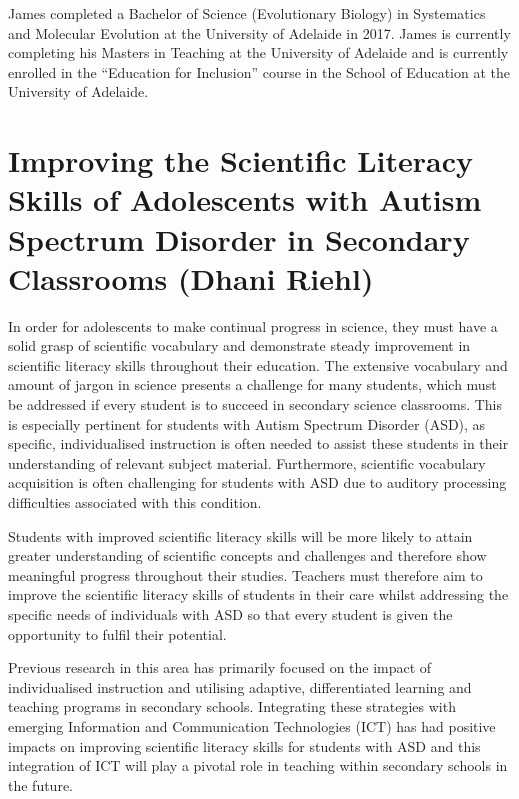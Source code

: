 \documentclass[twoside,12pt,a4paper,notitlepage]{memoir}
\begin{document}
James completed a Bachelor of Science (Evolutionary Biology) in Systematics and Molecular Evolution at the University of Adelaide in 2017. James is currently completing his Masters in Teaching at the University of Adelaide and is currently enrolled in the “Education for Inclusion” course in the School of Education at the University of Adelaide.



\pagebreak
\section*{Improving the Scientific Literacy Skills of Adolescents with Autism Spectrum Disorder in Secondary Classrooms (Dhani Riehl)}
\label{aut:riehl}

In order for adolescents to make continual progress in science, they must have a solid grasp of scientific vocabulary and demonstrate steady improvement in scientific literacy skills throughout their education. The extensive vocabulary and amount of jargon in science presents a challenge for many students, which must be addressed if every student is to succeed in secondary science classrooms. This is especially pertinent for students with Autism Spectrum Disorder (ASD), as specific, individualised instruction is often needed to assist these students in their understanding of relevant subject material. Furthermore, scientific vocabulary acquisition is often challenging for students with ASD due to auditory processing difficulties associated with this condition.

Students with improved scientific literacy skills will be more likely to attain greater understanding of scientific concepts and challenges and therefore show meaningful progress throughout their studies. Teachers must therefore aim to improve the scientific literacy skills of students in their care whilst addressing the specific needs of individuals with ASD so that every student is given the opportunity to fulfil their potential.

Previous research in this area has primarily focused on the impact of individualised instruction and utilising adaptive, differentiated learning and teaching programs in secondary schools. Integrating these strategies with emerging Information and Communication Technologies (ICT) has had positive impacts on improving scientific literacy skills for students with ASD and this integration of ICT will play a pivotal role in teaching within secondary schools in the future.
\end{document}

